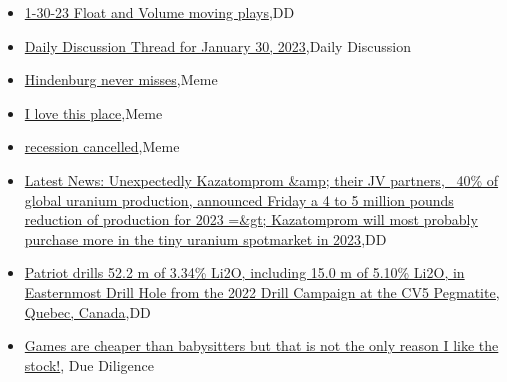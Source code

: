 \documentclass{article}%
\begin{document}
%
\begin{itemize}%
\item%
\href{https://reddit.com/r/wallstreetbets/comments/10p10fu/13023\_float\_and\_volume\_moving\_plays/}{1-30-23 Float and Volume moving plays},DD%
\item%
\href{https://reddit.com/r/wallstreetbets/comments/10oz8a0/daily\_discussion\_thread\_for\_january\_30\_2023/}{Daily Discussion Thread for January 30, 2023},Daily Discussion%
\item%
\href{https://reddit.com/r/wallstreetbets/comments/10oyory/hindenburg\_never\_misses/}{Hindenburg never misses},Meme%
\item%
\href{https://reddit.com/r/wallstreetbets/comments/10ox0xv/i\_love\_this\_place/}{I love this place},Meme%
\item%
\href{https://reddit.com/r/wallstreetbets/comments/10owqgy/recession\_cancelled/}{recession cancelled},Meme%
\item%
\href{https://reddit.com/r/Baystreetbets/comments/10p03l8/latest\_news\_unexpectedly\_kazatomprom\_their\_jv/}{Latest News: Unexpectedly Kazatomprom \&amp; their JV partners, ~40\% of global uranium production, announced Friday a 4 to 5 million pounds reduction of production for 2023 =\&gt; Kazatomprom will most probably purchase more in the tiny uranium spotmarket in 2023},DD%
\item%
\href{https://reddit.com/r/Baystreetbets/comments/10okzf0/patriot\_drills\_522\_m\_of\_334\_li2o\_including\_150\_m/}{Patriot drills 52.2 m of 3.34\% Li2O, including 15.0 m of 5.10\% Li2O, in Easternmost Drill Hole from the 2022 Drill Campaign at the CV5 Pegmatite, Quebec, Canada},DD%
\item%
\href{https://reddit.com/r/Superstonk/comments/10ovmph/games\_are\_cheaper\_than\_babysitters\_but\_that\_is/}{Games are cheaper than babysitters but that is not the only reason I like the stock!}, Due Diligence%
\end{itemize}%
\end{document}
